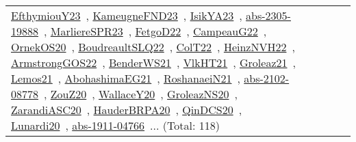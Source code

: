 {\begin{longtable}{lp{3cm}>{\raggedright\arraybackslash}p{6cm}>{\raggedright\arraybackslash}p{6cm}>{\raggedright\arraybackslash}p{8cm}}
\href{../works/EfthymiouY23.pdf}{EfthymiouY23}~\cite{EfthymiouY23}, \href{../works/KameugneFND23.pdf}{KameugneFND23}~\cite{KameugneFND23}, \href{../works/IsikYA23.pdf}{IsikYA23}~\cite{IsikYA23}, \href{../works/abs-2305-19888.pdf}{abs-2305-19888}~\cite{abs-2305-19888}, \href{../works/MarliereSPR23.pdf}{MarliereSPR23}~\cite{MarliereSPR23}, \href{../works/FetgoD22.pdf}{FetgoD22}~\cite{FetgoD22}, \href{../works/CampeauG22.pdf}{CampeauG22}~\cite{CampeauG22}, \href{../works/OrnekOS20.pdf}{OrnekOS20}~\cite{OrnekOS20}, \href{../works/BoudreaultSLQ22.pdf}{BoudreaultSLQ22}~\cite{BoudreaultSLQ22}, \href{../works/ColT22.pdf}{ColT22}~\cite{ColT22}, \href{../works/HeinzNVH22.pdf}{HeinzNVH22}~\cite{HeinzNVH22}, \href{../works/ArmstrongGOS22.pdf}{ArmstrongGOS22}~\cite{ArmstrongGOS22}, \href{../works/BenderWS21.pdf}{BenderWS21}~\cite{BenderWS21}, \href{../works/VlkHT21.pdf}{VlkHT21}~\cite{VlkHT21}, \href{../works/Groleaz21.pdf}{Groleaz21}~\cite{Groleaz21}, \href{../works/Lemos21.pdf}{Lemos21}~\cite{Lemos21}, \href{../works/AbohashimaEG21.pdf}{AbohashimaEG21}~\cite{AbohashimaEG21}, \href{../works/RoshanaeiN21.pdf}{RoshanaeiN21}~\cite{RoshanaeiN21}, \href{../works/abs-2102-08778.pdf}{abs-2102-08778}~\cite{abs-2102-08778}, \href{../works/ZouZ20.pdf}{ZouZ20}~\cite{ZouZ20}, \href{../works/WallaceY20.pdf}{WallaceY20}~\cite{WallaceY20}, \href{../works/GroleazNS20.pdf}{GroleazNS20}~\cite{GroleazNS20}, \href{../works/ZarandiASC20.pdf}{ZarandiASC20}~\cite{ZarandiASC20}, \href{../works/HauderBRPA20.pdf}{HauderBRPA20}~\cite{HauderBRPA20}, \href{../works/QinDCS20.pdf}{QinDCS20}~\cite{QinDCS20}, \href{../works/Lunardi20.pdf}{Lunardi20}~\cite{Lunardi20}, \href{../works/abs-1911-04766.pdf}{abs-1911-04766}~\cite{abs-1911-04766}... (Total: 118)\\

\end{longtable}}
